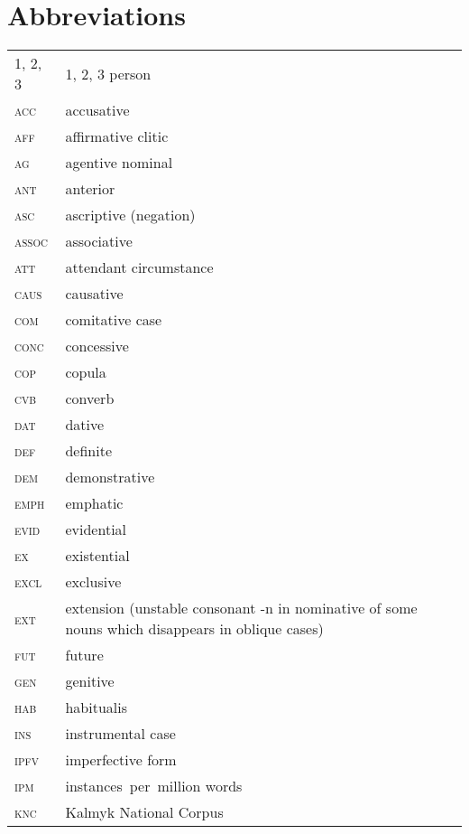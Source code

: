 \documentclass[output=paper,draft,draftmode,colorlinks,citecolor=brown]{langscibook}
\begin{document}
\section*{Abbreviations}
\begin{tabularx}{.45\textwidth}{lQ}
    \textsc{1, 2, 3} & 1, 2, 3 person\\
    \textsc{acc} & accusative\\
    \textsc{aff} & affirmative clitic\\
    \textsc{ag} & agentive nominal\\
     \textsc{ant} & anterior\\
    \textsc{asc} & ascriptive (negation)\\
    \textsc{assoc} & associative\\
    \textsc{att} & attendant circumstance\\
    \textsc{caus} & causative\\
    \textsc{com} & comitative case\\
    \textsc{conc} & concessive\\
    \textsc{cop} & copula\\
    \textsc{cvb} & converb\\
    \textsc{dat} & dative\\
    \textsc{def} & definite\\
    \textsc{dem} & demonstrative\\
     \textsc{emph} & emphatic\\
    \textsc{evid} & evidential\\
     \textsc{ex} & existential\\
    \textsc{excl} & exclusive\\
    \textsc{ext} & extension (unstable consonant -n in nominative of some nouns which disappears in oblique cases)\\
    \textsc{fut} & future\\
    \textsc{gen} & genitive\\
    \textsc{hab} & habitualis\\
    \textsc{ins} & instrumental case\\
    \textsc{ipfv} & imperfective form\\
    \textsc{ipm} & instances per million words\\
    \textsc{knc} & Kalmyk National Corpus\\
\end{tabularx}
\end{document}
